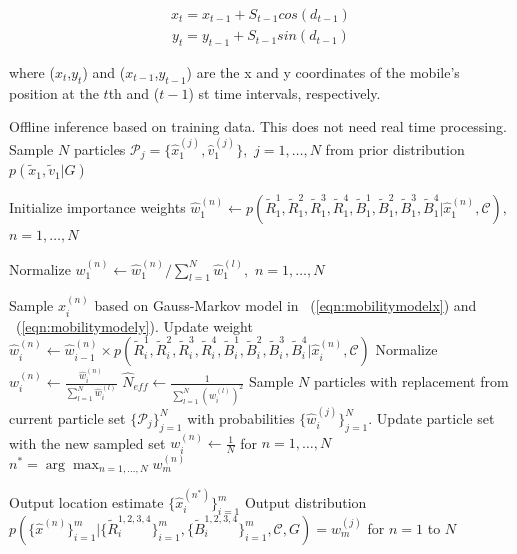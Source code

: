 \documentclass[conference, 10pt]{IEEEtran}
\begin{document}
\begin{align}
	x_t = x_{t-1} +S_{t-1}cos(d_{t-1})
\label{eqn:mobilitymodelx}
\end{align}
\begin{align}
y_t = y_{t-1} +S_{t-1}sin(d_{t-1})
\label{eqn:mobilitymodely}
\end{align}

where ($x_t$,$y_t$) and ($x_{t-1}$,$y_{t-1}$) are the x and y coordinates of the mobile’s position 
at the $t$th and ($t-1$) st time intervals, respectively.

\begin{algorithm}
\caption{$LocalizeUEpf(\mathcal{D}_{tr},\mathcal{C},G,N_{th})$}
\label{alg:LocalizeUEpf}
\begin{algorithmic}[1]
\State Offline inference based on training data. This does not need real time processing.
\State Sample $N$ particles $\mathcal{P}_j = \{\hat{x}_1^{(j)},\hat{v}_1^{(j)}\},$ $j=1,\hdots , N$ 
from prior distribution $p(\tilde{x}_1, \tilde{v}_1|G)$ 

\State Initialize importance weights $\hat{w}_1^{(n)} \gets p(\tilde{R}^1_1,\tilde{R}^2_1,\tilde{R}^3_1,\tilde{R}^4_1, \tilde{B}^1_1, \tilde{B}^2_1, \tilde{B}^3_1, \tilde{B}^4_1|\hat{x}_1^{(n)}, \mathcal{C}),$ $n=1,\hdots , N$

\State Normalize $w_1^{(n)} \gets \hat{w}_1^{(n)}/\sum_{l=1}^N \hat{w}_1^{(l)},$ $n=1,\hdots , N$

		\State Sample $\hat{x}_i^{(n)}$ based on Gauss-Markov model in ~(\ref{eqn:mobilitymodelx}) and ~(\ref{eqn:mobilitymodely}).
		\State Update weight $\hat{w}_i^{(n)} \gets \hat{w}_{i-1}^{(n)} \times p(\tilde{R}^1_i, \tilde{R}^2_i,\tilde{R}^3_i,\tilde{R}^4_i, \tilde{B}^1_i, \tilde{B}^2_i, \tilde{B}^3_i, \tilde{B}^4_i|\hat{x}_{i}^{(n)},\mathcal{C})$ 
	\EndFor
	\State Normalize $w_i^{(n)} \gets \frac{\hat{w}_i^{(n)}}{\sum_{l=1}^N \hat{w}_i^{(l)}}$
	\State $\hat{N}_{eff} \gets \frac{1}{\sum_{l=1}^N (w_{i}^{(l)})^2}$
		\State Sample $N$ particles with replacement from current particle set $\{\mathcal{P}_j\}_{j=1}^N$ with probabilities $\{\hat{w}_i^{(j)}\}_{j=1}^N.$ Update particle set with the new sampled set
		\State $w_i^{(n)} \gets \frac{1}{N}$ for $n=1,\hdots , N$
	\EndIf
\EndFor
\State $n^* = \arg \max_{n = 1 , \hdots, N} w_m^{(n)}$

\State Output location estimate $\{\hat{x}_i^{(n^*)}\}_{i=1}^m$ 
\State Output distribution \\
$p(\{\hat{x}^{(n)}\}_{i=1}^m|\{\tilde{R}^{1,2,3,4}_i\}_{i=1}^m,\{\tilde{B}^{1,2,3,4}_i\}_{i=1}^m,\mathcal{C},G) = w_m^{(j)}$ for $n=1$ to $N$
\end{algorithmic}
\end{algorithm}  
\end{document}
